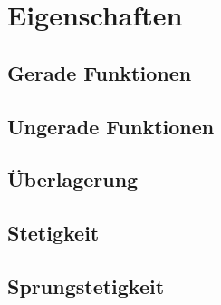 \section{Eigenschaften}

\subsection{Gerade Funktionen}

\subsection{Ungerade Funktionen}

\subsection{Überlagerung}

\subsection{Stetigkeit}

\subsection{Sprungstetigkeit}
